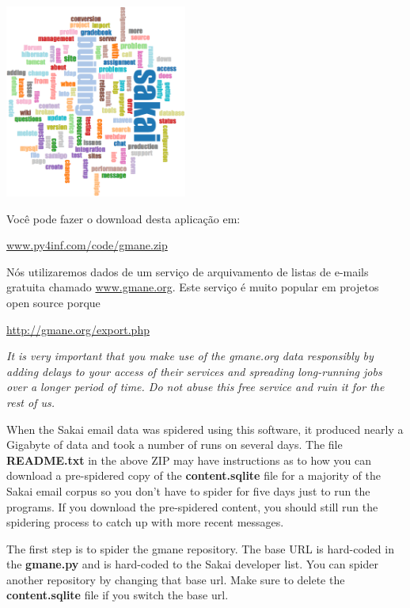 \beforefig
\centerline{\includegraphics[height=2.50in]{figs2/wordcloud.eps}}
\afterfig

Você pode fazer o download desta aplicação em:

\url{www.py4inf.com/code/gmane.zip}

Nós utilizaremos dados de um serviço de arquivamento de listas de e-mails
gratuita chamado \url{www.gmane.org}. Este serviço é muito popular em projetos
open source porque

\url{http://gmane.org/export.php}

{\em It is very important that you make use of the gmane.org data
responsibly by adding delays to your access of their services and spreading
long-running jobs over a longer period of time.  Do not abuse this free service
and ruin it for the rest of us.}

When the Sakai email data was spidered using this software, it produced nearly 
a Gigabyte of data and took a number of runs on several days.
The file {\bf README.txt} in the above ZIP may have instructions as to how
you can download a pre-spidered copy of the {\bf content.sqlite} file for 
a majority of the Sakai email corpus so you don't have to spider for 
five days just to run the programs.  If you download the pre-spidered
content, you should still run the spidering process to catch up with 
more recent messages.

The first step is to spider the gmane repository.  The base URL 
is hard-coded in the {\bf gmane.py} and is hard-coded to the Sakai
developer list.  You can spider another repository by changing that
base url.   Make sure to delete the {\bf content.sqlite} file if you 
switch the base url.  

